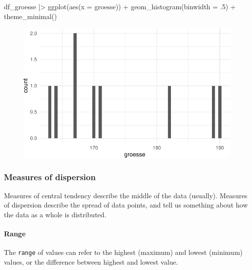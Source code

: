 \documentclass[
  letterpaper,
  DIV=11,
  numbers=noendperiod]{scrartcl}
\let\oldparagraph\paragraph
\renewcommand{\paragraph}[1]{\oldparagraph{#1}\mbox{}}
\newenvironment{Shaded}{\begin{snugshade}}{\end{snugshade}}
\newcommand{\AttributeTok}[1]{\textcolor[rgb]{0.40,0.45,0.13}{#1}}
\newcommand{\DecValTok}[1]{\textcolor[rgb]{0.68,0.00,0.00}{#1}}
\newcommand{\FunctionTok}[1]{\textcolor[rgb]{0.28,0.35,0.67}{#1}}
\newcommand{\NormalTok}[1]{\textcolor[rgb]{0.00,0.23,0.31}{#1}}
\newcommand{\SpecialCharTok}[1]{\textcolor[rgb]{0.37,0.37,0.37}{#1}}
\begin{document}
\begin{Shaded}
\begin{Highlighting}[]
\NormalTok{df\_groesse }\SpecialCharTok{|\textgreater{}}
  \FunctionTok{ggplot}\NormalTok{(}\FunctionTok{aes}\NormalTok{(}\AttributeTok{x =}\NormalTok{ groesse)) }\SpecialCharTok{+}
  \FunctionTok{geom\_histogram}\NormalTok{(}\AttributeTok{binwidth =}\NormalTok{ .}\DecValTok{5}\NormalTok{) }\SpecialCharTok{+}
  \FunctionTok{theme\_minimal}\NormalTok{() }
\end{Highlighting}
\end{Shaded}

\begin{figure}[H]

{\centering \includegraphics{08-desc_stats_en_files/figure-pdf/unnamed-chunk-22-1.pdf}

}

\end{figure}

\hypertarget{measures-of-dispersion}{%
\subsubsection{Measures of dispersion}\label{measures-of-dispersion}}

Measures of central tendency describe the middle of the data (usually).
Measures of dispersion describe the spread of data points, and tell us
something about how the data as a whole is distributed.

\hypertarget{range}{%
\paragraph{Range}\label{range}}

The \texttt{range} of values can refer to the highest (maximum) and
lowest (minimum) values, or the difference between highest and lowest
value.
\end{document}
